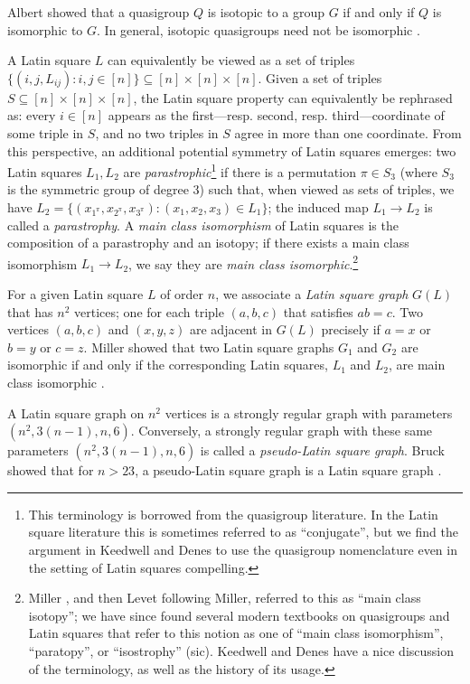 \documentclass{article}
\begin{document}
Albert showed that a quasigroup $Q$ is isotopic to a group $G$ if and only if $Q$ is isomorphic to $G$. In general, isotopic quasigroups need not be isomorphic \cite{Albert}.

A Latin square $L$ can equivalently be viewed as a set of triples $\{(i,j,L_{ij}) : i,j \in [n]\} \subseteq [n] \times [n] \times [n]$. Given a set of triples $S \subseteq [n] \times [n] \times [n]$, the Latin square property can equivalently be rephrased as: every $i \in [n]$ appears as the first---resp. second, resp. third---coordinate of some triple in $S$, and no two triples in $S$ agree in more than one coordinate. From this perspective, an additional potential symmetry of Latin squares emerges: two Latin squares $L_1, L_2$ are \emph{parastrophic}\footnote{This terminology is borrowed from the quasigroup literature. In the Latin square literature this is sometimes referred to as ``conjugate'', but we find the argument in Keedwell and Denes \cite[pp. 15--16]{KeedwellDenes} to use  the quasigroup nomenclature even in the setting of Latin squares compelling.} if there is a permutation $\pi \in S_3$ (where $S_3$ is the symmetric group of degree $3$) such that, when viewed as sets of triples, we have $L_2 = \{(x_{1^\pi}, x_{2^\pi}, x_{3^\pi}) : (x_1, x_2, x_3) \in L_1\}$; the induced map $L_1 \to L_2$ is called a \emph{parastrophy}. A \emph{main class isomorphism} of Latin squares is the composition of a parastrophy and an isotopy; if there exists a main class isomorphism $L_1 \to L_2$, we say they are \emph{main class isomorphic}.\footnote{Miller \cite{MillerTarjan}, and then Levet \cite{LevetLatinSquares} following Miller, referred to this as ``main class isotopy''; we have since found several modern textbooks on quasigroups and Latin squares that refer to this notion as one of ``main class isomorphism'', ``paratopy'', or ``isostrophy'' (sic). Keedwell and Denes \cite[pp. 15--16]{KeedwellDenes} have a nice discussion of the  terminology, as well as the history of its usage.}

For a given Latin square $L$ of order $n$, we associate a \textit{Latin square graph} $G(L)$ that has $n^{2}$ vertices; one for each triple $(a, b, c)$ that satisfies $ab = c$. Two vertices $(a, b, c)$ and $(x, y, z)$ are adjacent in $G(L)$ precisely if $a = x$ or $b = y$ or $c = z$. Miller showed that two Latin square graphs $G_{1}$ and $G_{2}$ are isomorphic if and only if the corresponding Latin squares, $L_{1}$ and $L_{2}$, are main class isomorphic \cite{MillerTarjan}. 

A Latin square graph on $n^{2}$ vertices is a strongly regular graph with parameters $(n^{2}, 3(n-1), n, 6)$. Conversely, a strongly regular graph with these same parameters $(n^{2}, 3(n-1), n, 6)$ is called a \textit{pseudo-Latin square graph}. Bruck showed that for $n > 23$, a pseudo-Latin square graph is a Latin square graph \cite{Bruck}.
\end{document}
